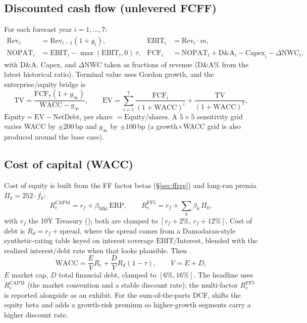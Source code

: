 \documentclass[11pt]{article}
\begin{document}
\subsection{Discounted cash flow (unlevered FCFF)}
For each forecast year $i=1,\dots,7$:
\begin{align}
  \text{Rev}_i&=\text{Rev}_{i-1}(1+g_i), &
  \text{EBIT}_i&=\text{Rev}_i\cdot m, \\
  \text{NOPAT}_i&=\text{EBIT}_i-\max(\text{EBIT}_i,0)\,\tau, &
  \text{FCF}_i&=\text{NOPAT}_i+\text{D\&A}_i-\text{Capex}_i-\Delta\text{NWC}_i,
\end{align}
with D\&A, Capex, and $\Delta$NWC taken as fractions of revenue (D\&A\% from the
latest historical ratio). Terminal value uses Gordon growth, and the
enterprise/equity bridge is
\begin{equation}
  \text{TV}=\frac{\text{FCF}_7(1+g_\infty)}{\text{WACC}-g_\infty},\qquad
  \text{EV}=\sum_{i=1}^{7}\frac{\text{FCF}_i}{(1+\text{WACC})^i}+\frac{\text{TV}}{(1+\text{WACC})^7},
\end{equation}
$\text{Equity}=\text{EV}-\text{NetDebt}$, per share $=\text{Equity}/\text{shares}$.
A $5\times5$ sensitivity grid varies WACC by $\pm200$\,bp and $g_\infty$ by
$\pm100$\,bp (a growth$\times$WACC grid is also produced around the base case).

\subsection{Cost of capital (WACC)}
\label{sec:wacc}
Cost of equity is built from the FF factor betas (\S\ref{sec:ffreg}) and long-run
premia $\Pi_k=252\cdot\overline{f_k}$:
\begin{equation}
  R_e^{\text{CAPM}}=r_f+\beta_{\text{Mkt}}\,\text{ERP},\qquad
  R_e^{\text{FF5}}=r_f+\sum_k\beta_k\,\Pi_k,
\end{equation}
with $r_f$ the 10Y Treasury (); both are clamped to
$[r_f+2\%,\,r_f+12\%]$. Cost of debt is $R_d=r_f+\text{spread}$, where the spread
comes from a Damodaran-style synthetic-rating table keyed on interest coverage
$\text{EBIT}/\text{Interest}$, blended with the realized $\text{interest}/\text{debt}$
rate when that looks plausible. Then
\begin{equation}
  \text{WACC}=\frac{E}{V}R_e+\frac{D}{V}R_d(1-\tau),\qquad V=E+D,
\end{equation}
$E$ market cap, $D$ total financial debt, clamped to $[6\%,16\%]$. The headline
uses $R_e^{\text{CAPM}}$ (the market convention and a stable discount rate); the
multi-factor $R_e^{\text{FF5}}$ is reported alongside as an exhibit. For the
sum-of-the-parts DCF,  shifts the equity beta and adds a
growth-risk premium so higher-growth segments carry a higher discount rate.
\end{document}
